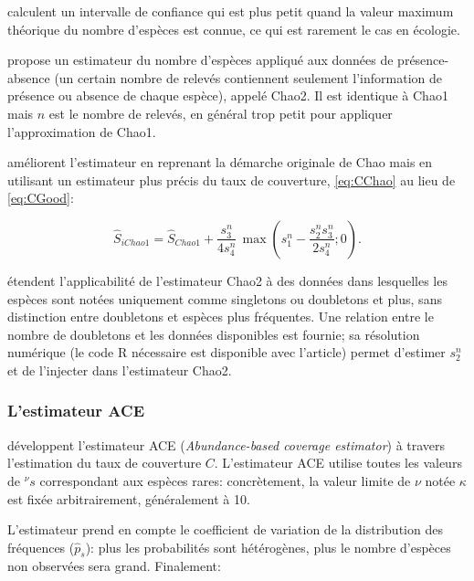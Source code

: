 \documentclass[
  11pt,
  french,
  a4paper,
  extrafontsizes,onecolumn,openright
  ]{memoir}
\begin{document}
\textcite[eq. 8]{Eren2012} calculent un intervalle de confiance qui est plus petit quand la valeur maximum théorique du nombre d'espèces est connue, ce qui est rarement le cas en écologie.

\textcite{Chao1987} propose un estimateur du nombre d'espèces appliqué aux données de présence-absence (un certain nombre de relevés contiennent seulement l'information de présence ou absence de chaque espèce), appelé Chao2. Il est identique à Chao1 mais \(n\) est le nombre de relevés, en général trop petit pour appliquer l'approximation de Chao1.

\textcite{Chiu2014a} améliorent l'estimateur en reprenant la démarche originale de Chao mais en utilisant un estimateur plus précis du taux de couverture, \eqref{eq:CChao} au lieu de \eqref{eq:CGood}:

\begin{equation}
  \label{eq:iChao1}
  {\hat{S}}_\mathit{iChao1} 
  = {\hat{S}}_\mathit{Chao1} 
  + \frac{s^{n}_{3}}{4s^{n}_{4}}\,
  \max\left(s^{n}_{1}-\frac{s^{n}_{2}s^{n}_{3}}{2s^{n}_{4}};0\right).
\end{equation}

\textcite{Chao2017} étendent l'applicabilité de l'estimateur Chao2 à des données dans lesquelles les espèces sont notées uniquement comme singletons ou doubletons et plus, sans distinction entre doubletons et espèces plus fréquentes.
Une relation entre le nombre de doubletons et les données disponibles est fournie; sa résolution numérique (le code R nécessaire est disponible avec l'article) permet d'estimer \(s^{n}_{2}\) et de l'injecter dans l'estimateur Chao2.

\hypertarget{lestimateur-ace}{%
\subsubsection{L'estimateur ACE}\label{lestimateur-ace}}

\textcite{Chao1992} développent l'estimateur ACE (\emph{Abundance-based coverage estimator}) à travers l'estimation du taux de couverture \(C\).
L'estimateur ACE utilise toutes les valeurs de \(^{\nu }s\) correspondant aux espèces rares: concrètement, la valeur limite de \(\nu\) notée \(\kappa\) est fixée arbitrairement, généralement à 10.

L'estimateur prend en compte le coefficient de variation de la distribution des fréquences (\({\hat{p}}_s\)): plus les probabilités sont hétérogènes, plus le nombre d'espèces non observées sera grand.
Finalement:
\end{document}
